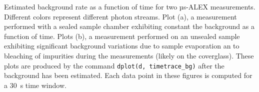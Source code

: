 \label{fig:bg_timetrace} Estimated background rate as a function of time for two µs-ALEX measurements. Different colors represent different photon streams. Plot (a), a measurement performed with a sealed sample chamber exhibiting constant the background as a function of time. Plots (b), a measurement performed on an unsealed sample exhibiting significant background variations due to sample evaporation an to bleaching of impurities during the measurements (likely on the coverglass). These plots are produced by the command
\texttt{dplot(d, timetrace\_bg)} after the background has been estimated. Each data point in these figures is computed for a 30~s time window.